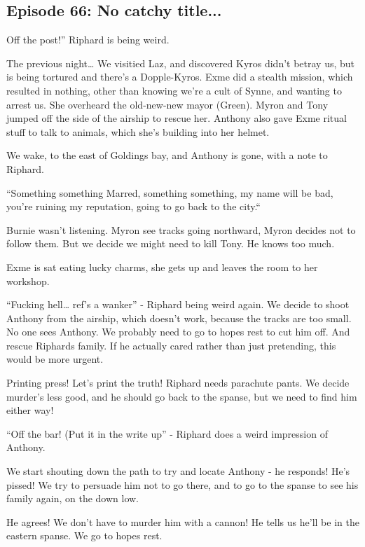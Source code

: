 \subsection{Episode 66: No catchy title...}

Off the post!” Riphard is being weird.\medskip

The previous night… We visitied Laz, and discovered Kyros didn’t betray us, but is being tortured and there’s a Dopple-Kyros. Exme did a stealth mission, which resulted in nothing, other than knowing we’re a cult of Synne, and wanting to arrest us. She overheard the old-new-new mayor (Green). Myron and Tony jumped off the side of the airship to rescue her. Anthony also gave Exme ritual stuff to talk to animals, which she’s building into her helmet.\medskip

We wake, to the east of Goldings bay, and Anthony is gone, with a note to Riphard.\medskip

“Something something Marred, something something, my name will be bad, you’re ruining my reputation, going to go back to the city.“\medskip

Burnie wasn’t listening. Myron see tracks going northward, Myron decides not to follow them. But we decide we might need to kill Tony. He knows too much.\medskip

Exme is sat eating lucky charms, she gets up and leaves the room to her workshop.\medskip

“Fucking hell… ref’s a wanker” - Riphard being weird again. We decide to shoot Anthony from the airship, which doesn’t work, because the tracks are too small. No one sees Anthony. We probably need to go to hopes rest to cut him off. And rescue Riphards family. If he actually cared rather than just pretending, this would be more urgent.\medskip

Printing press! Let’s print the truth! Riphard needs parachute pants. We decide murder’s less good, and he should go back to the spanse, but we need to find him either way!\medskip

“Off the bar! (Put it in the write up” - Riphard does a weird impression of Anthony.\medskip

We start shouting down the path to try and locate Anthony - he responds! He’s pissed! We try to persuade him not to go there, and to go to the spanse to see his family again, on the down low.\medskip

He agrees! We don’t have to murder him with a cannon! He tells us he’ll be in the eastern spanse. We go to hopes rest.\medskip

